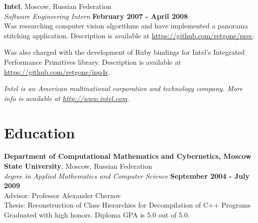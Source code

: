 \documentclass[margin,line]{CV}
\def\superofficial{}
\begin{document}
\begin{resume}
   
    \textbf{Intel}, Moscow, Russian Federation \vspace{2mm}\\\vspace{1mm}%
    \textsl{Software Engineering Intern} \hfill \textbf{February 2007 - April 2008}\\
    Was researching computer vision algorithms and have implemented a panorama stitching application. Description is available at \url{https://github.com/retgone/prec}.

    Was also charged with the development of Ruby bindings for Intel's Integrated Performance Primitives library. Description is available at \url{https://github.com/retgone/ipp4r}.
    
\ifdefined\superofficial
    {\footnotesize\textit{Intel is an American multinational corporation and technology company. More info is available at \url{http://www.intel.com}.}}
\fi
    
    
   
   
    \pagebreak    

   
    \section{\mysidestyle Education}
    \textbf{Department of Computational Mathematics and Cybernetics, Moscow State University}, Moscow, Russian Federation \vspace{2mm}\\\vspace{1mm}%
    \textsl{ degree in Applied Mathematics and Computer Science} \hfill \textbf{September 2004 - July 2009}\vspace{1mm}\\
    Advisor: Professor Alexander Chernov \\
    Thesis: Reconstruction of Class Hierarchies for Decompilation of C++ Programs \\
    Graduated with high honors. Diploma GPA is 5.0 out of 5.0.


\end{resume}
\end{document}
